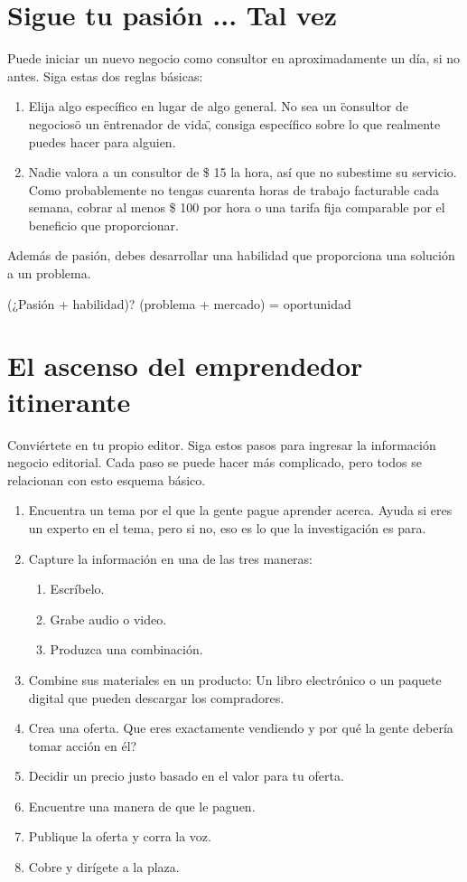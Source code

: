 \documentclass[10pt]{book}
\begin{document}
    \chapter{Sigue tu pasión ... Tal vez}
    Puede iniciar un nuevo negocio como consultor en aproximadamente un día, si no antes. Siga estas dos reglas básicas:
    \begin{enumerate}[\bfseries 1.]
	\item Elija algo específico en lugar de algo general. No sea un \"consultor de negocios\" o un \"entrenador de vida\", consiga específico sobre lo que realmente puedes hacer para alguien.    
	\item Nadie valora a un consultor de \$ 15 la hora, así que no subestime su servicio. Como probablemente no tengas cuarenta horas de trabajo facturable cada semana, cobrar al menos \$ 100 por hora o una tarifa fija comparable por el beneficio que proporcionar.    
    \end{enumerate}
    Además de pasión, debes desarrollar una habilidad que proporciona una solución a un problema.
    \begin{center}
	(¿Pasión + habilidad)? (problema + mercado) = oportunidad
    \end{center}

    \chapter{El ascenso del emprendedor itinerante}
    Conviértete en tu propio editor. Siga estos pasos para ingresar la información negocio editorial. Cada paso se puede hacer más complicado, pero todos se relacionan con esto esquema básico.
    \begin{enumerate}[\bfseries 1.]
	    \item Encuentra un tema por el que la gente pague aprender acerca. Ayuda si eres un experto en el tema, pero si no, eso es lo que la investigación es para.    
	    \item Capture la información en una de las tres maneras:
		\begin{enumerate}[\bfseries a)]
		    \item Escríbelo.
		    \item Grabe audio o video.
		    \item Produzca una combinación.
		\end{enumerate}
	    \item Combine sus materiales en un producto: Un libro electrónico o un paquete digital que pueden descargar los compradores.
	    \item Crea una oferta. Que eres exactamente vendiendo y por qué la gente debería tomar acción en él?
	    \item Decidir un precio justo basado en el valor para tu oferta.
	    \item Encuentre una manera de que le paguen.
	    \item Publique la oferta y corra la voz.
	    \item Cobre y dirígete a la plaza.
    \end{enumerate}
\end{document}
